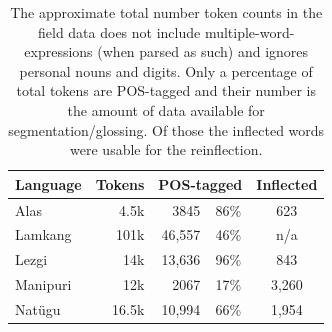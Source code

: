 \begin{table}
    \centering
    \begin{tabular}{l|r|rc|c}
         \textbf{Language} & \textbf{Tokens} & \multicolumn{2}{c|}{\textbf{POS-tagged}}  & \textbf{Inflected}\\
         \hline
         Alas & 4.5k & 3845  & 86\% & 623 \\
         \hline
         Lamkang & 101k & 46,557 & 46\% & n/a \\
         \hline
         Lezgi & 14k & 13,636 & 96\%  & 843 \\
         \hline
         Manipuri & 12k & 2067 & 17\% & 3,260\\
         \hline
         Natügu & 16.5k & 10,994 & 66\% & 1,954\\
    \end{tabular}
    \caption{The approximate total number token counts in the field data does not include multiple-word-expressions (when parsed as such) and ignores personal nouns and digits. Only a percentage of total tokens are POS-tagged and their number is the amount of data available for segmentation/glossing. Of those the inflected words were usable for the reinflection.}
    \label{tab:IGTdata}
\end{table}


